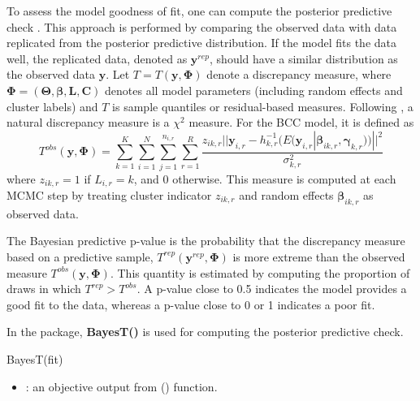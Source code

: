 To assess the model goodness of fit, one can compute the posterior predictive check \citep{Gelman1996}. This approach is performed by comparing the observed data with data replicated from the posterior predictive distribution. If the model fits the data well, the replicated data, denoted as $\boldsymbol{y}^{rep}$, should have a similar distribution as the observed data $\boldsymbol{y}$. Let $T = T(\boldsymbol{y},\boldsymbol{\Phi})$ denote a discrepancy measure, where $\boldsymbol{\Phi} = (\boldsymbol{\Theta}, \boldsymbol{\beta}, \boldsymbol{L}, \boldsymbol{C})$ denotes all model parameters (including random effects and cluster labels) and $T$ is sample quantiles or residual-based measures. Following \citet{Gelman1996}, a natural discrepancy measure is a $\chi^2$ measure. For the BCC model, it is defined as 
\begin{equation}
T^{obs}(\boldsymbol{y},\boldsymbol{\Phi})= \sum^K_{k=1} \sum_{i=1}^N \sum_{j=1}^{n_{i,r}}   \sum_{r=1}^R \frac{ z_{ik,r} ||\boldsymbol{y}_{i,r} - h^{-1}_{k,r}(E(\boldsymbol{y}_{i,r}|\boldsymbol{\beta}_{ik,r},\boldsymbol{\gamma}_{k,r}))||^2}{\sigma_{k,r}^2} 
\end{equation}
where $z_{ik,r} = 1$ if $L_{i,r}=k$, and 0 otherwise. This measure is computed at each MCMC step by treating cluster indicator $z_{ik,r}$ and random effects $\boldsymbol{\beta}_{ik,r}$ as observed data.

The Bayesian predictive p-value is the probability that the discrepancy measure based on a predictive sample, $ T^{rep}(\boldsymbol{y}^{rep},\boldsymbol{\Phi})$ is more extreme than the observed measure $T^{obs}(\boldsymbol{y},\boldsymbol{\Phi})$. This quantity is estimated by computing the proportion of draws in which $T^{rep} > T^{obs}$. A p-value close to 0.5 indicates the model provides a good fit to the data, whereas a p-value close to 0 or 1 indicates a poor fit.

In the  package, \textbf{BayesT()} is used for computing the posterior predictive check. 

\begin{example}
BayesT(fit)
\end{example}

\begin{itemize}

	\item {}: an objective output from () function.  

\end{itemize}

